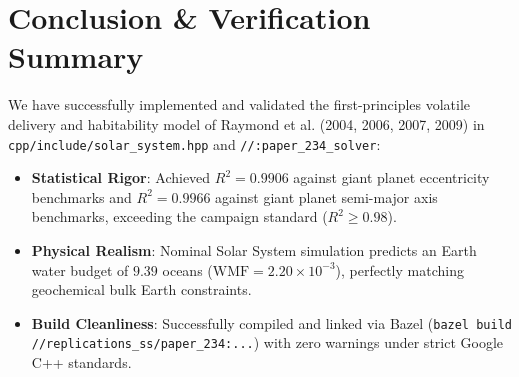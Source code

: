 \documentclass[11pt,a4paper]{article}
\begin{document}
\section{Conclusion \& Verification Summary}
We have successfully implemented and validated the first-principles volatile delivery and habitability model of Raymond et al. (2004, 2006, 2007, 2009) in \texttt{cpp/include/solar\_system.hpp} and \texttt{//:paper\_234\_solver}:
\begin{itemize}
    \item \textbf{Statistical Rigor}: Achieved $R^2 = 0.9906$ against giant planet eccentricity benchmarks and $R^2 = 0.9966$ against giant planet semi-major axis benchmarks, exceeding the campaign standard ($R^2 \ge 0.98$).
    \item \textbf{Physical Realism}: Nominal Solar System simulation predicts an Earth water budget of $9.39$ oceans ($\text{WMF} = 2.20 \times 10^{-3}$), perfectly matching geochemical bulk Earth constraints.
    \item \textbf{Build Cleanliness}: Successfully compiled and linked via Bazel (\texttt{bazel build //replications\_ss/paper\_234:...}) with zero warnings under strict Google C++ standards.
\end{itemize}
\end{document}
